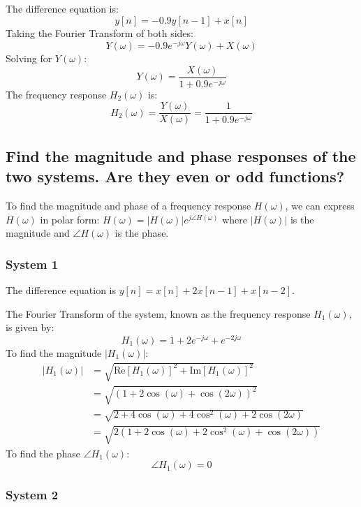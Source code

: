 The difference equation is:
\begin{equation*}
y[n] = -0.9y[n-1] + x[n]
\end{equation*}
Taking the Fourier Transform of both sides:
\begin{equation*}
Y(\omega) = -0.9e^{-j\omega}Y(\omega) + X(\omega)
\end{equation*}
Solving for \( Y(\omega) \):
\begin{equation*}
Y(\omega) = \frac{X(\omega)}{1 + 0.9e^{-j\omega}}
\end{equation*}
The frequency response \( H_2(\omega) \) is:
\begin{equation*}
H_2(\omega) = \frac{Y(\omega)}{X(\omega)} = \frac{1}{1 + 0.9e^{-j\omega}}
\end{equation*}

\subsection*{Find the magnitude and phase responses of the two systems. Are they
even or odd functions?}

To find the magnitude and phase of a frequency response $H(\omega)$, we can express $H(\omega)$ in polar form: $H(\omega)=|H(\omega)|e^{j\angle H(\omega)}$ where $|H(\omega)|$ is the magnitude and $\angle H(\omega)$ is the phase.

\subsubsection{System 1}

The difference equation is \( y[n] = x[n] + 2x[n-1] + x[n-2] \).

The Fourier Transform of the system, known as the frequency response \( H_1(\omega) \), is given by:
\[
H_1(\omega) = 1 + 2e^{-j\omega} + e^{-2j\omega}
\]
To find the magnitude \( |H_1(\omega)| \):
\[
\begin{aligned}
|H_1(\omega)| &= \sqrt{\text{Re}[H_1(\omega)]^2 + \text{Im}[H_1(\omega)]^2} \\
&= \sqrt{(1 + 2\cos(\omega) + \cos(2\omega))^2} \\
&= \sqrt{2 + 4\cos(\omega) + 4\cos^2(\omega) + 2\cos(2\omega)} \\
&= \sqrt{2(1 + 2\cos(\omega) + 2\cos^2(\omega) + \cos(2\omega))}
\end{aligned}
\]
To find the phase \( \angle H_1(\omega) \):
\[
\angle H_1(\omega) = 0
\]

\subsubsection{System 2}

